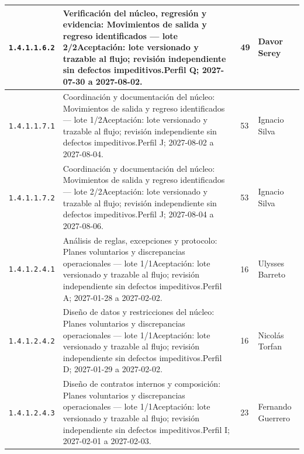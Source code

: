 \begin{longtable}{L{29mm}L{80mm}R{12mm}L{28mm}}
\texttt{1.\allowbreak{}4.\allowbreak{}1.\allowbreak{}1.\allowbreak{}6.\allowbreak{}2} & Verificación del núcleo, regresión y evidencia: Movimientos de salida y regreso identificados — lote 2/2\newline Aceptación: lote versionado y trazable al flujo; revisión independiente sin defectos impeditivos.\newline Perfil Q; 2027-07-30 a 2027-08-02. & 49 & Davor Serey\\\hline
\texttt{1.\allowbreak{}4.\allowbreak{}1.\allowbreak{}1.\allowbreak{}7.\allowbreak{}1} & Coordinación y documentación del núcleo: Movimientos de salida y regreso identificados — lote 1/2\newline Aceptación: lote versionado y trazable al flujo; revisión independiente sin defectos impeditivos.\newline Perfil J; 2027-08-02 a 2027-08-04. & 53 & Ignacio Silva\\\hline
\texttt{1.\allowbreak{}4.\allowbreak{}1.\allowbreak{}1.\allowbreak{}7.\allowbreak{}2} & Coordinación y documentación del núcleo: Movimientos de salida y regreso identificados — lote 2/2\newline Aceptación: lote versionado y trazable al flujo; revisión independiente sin defectos impeditivos.\newline Perfil J; 2027-08-04 a 2027-08-06. & 53 & Ignacio Silva\\\hline
\texttt{1.\allowbreak{}4.\allowbreak{}1.\allowbreak{}2.\allowbreak{}4.\allowbreak{}1} & Análisis de reglas, excepciones y protocolo: Planes voluntarios y discrepancias operacionales — lote 1/1\newline Aceptación: lote versionado y trazable al flujo; revisión independiente sin defectos impeditivos.\newline Perfil A; 2027-01-28 a 2027-02-02. & 16 & Ulysses Barreto\\\hline
\texttt{1.\allowbreak{}4.\allowbreak{}1.\allowbreak{}2.\allowbreak{}4.\allowbreak{}2} & Diseño de datos y restricciones del núcleo: Planes voluntarios y discrepancias operacionales — lote 1/1\newline Aceptación: lote versionado y trazable al flujo; revisión independiente sin defectos impeditivos.\newline Perfil D; 2027-01-29 a 2027-02-02. & 16 & Nicolás Torfan\\\hline
\texttt{1.\allowbreak{}4.\allowbreak{}1.\allowbreak{}2.\allowbreak{}4.\allowbreak{}3} & Diseño de contratos internos y composición: Planes voluntarios y discrepancias operacionales — lote 1/1\newline Aceptación: lote versionado y trazable al flujo; revisión independiente sin defectos impeditivos.\newline Perfil I; 2027-02-01 a 2027-02-03. & 23 & Fernando Guerrero\\\hline

\end{longtable}
